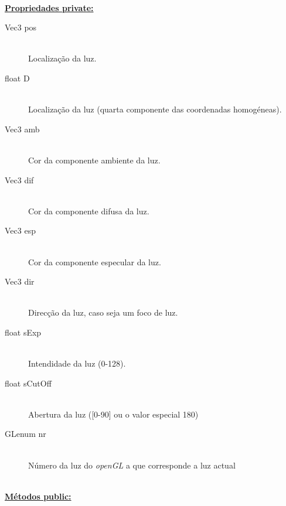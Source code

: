 \documentclass[a5paper,onecolumn, 11pt]{article}
\begin{document}
\hfill \\ \underline{\textbf{Propriedades private:}}

\begin{description}
	\item[Vec3 pos] \hfill \\
	Localização da luz.

	\item[float D] \hfill \\
	Localização da luz (quarta componente das coordenadas homogéneas).

	\item[Vec3 amb] \hfill \\
	Cor da componente ambiente da luz.

	\item[Vec3 dif] \hfill \\
	Cor da componente difusa da luz.

	\item[Vec3 esp] \hfill \\
	Cor da componente especular da luz.

	\item[Vec3 dir] \hfill \\
	Direcção da luz, caso seja um foco de luz.

	\item[float sExp] \hfill \\
	Intendidade da luz (0-128).

	\item[float sCutOff] \hfill \\
	Abertura da luz ([0-90] ou o valor especial 180)

	\item[GLenum nr] \hfill \\
	Número da luz do \textit{openGL} a que corresponde a luz actual
\end{description}

\hfill \\ \underline{\textbf{Métodos public:}}
\end{document}
